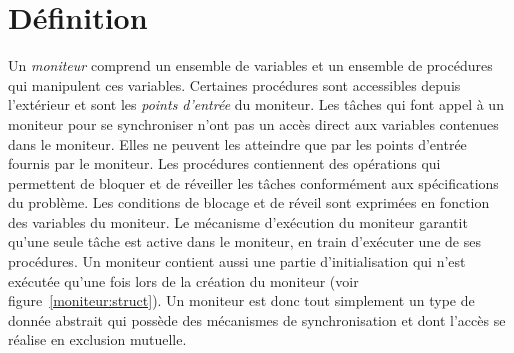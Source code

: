\section{Définition}
Un {\em moniteur} comprend un ensemble de variables et un ensemble de procédures qui manipulent ces variables. Certaines procédures sont accessibles depuis l'extérieur et sont les {\em points d'entrée} du moniteur. Les tâches qui font appel à un moniteur pour se synchroniser n'ont pas un accès direct aux variables contenues dans le moniteur. Elles ne peuvent les atteindre que par les points d'entrée fournis par le moniteur. Les procédures contiennent des opérations qui permettent de bloquer et de réveiller les tâches conformément aux spécifications du problème. Les conditions de blocage et de réveil sont exprimées en fonction des variables du moniteur. Le mécanisme d'exécution du moniteur garantit qu'une seule tâche est active dans le moniteur, en train d'exécuter une de ses procédures. Un moniteur contient aussi une partie d'initialisation qui n'est exécutée qu'une fois lors de la création du moniteur (voir figure~\ref{moniteur:struct}). Un moniteur est donc tout simplement un type de donnée abstrait qui possède des mécanismes de synchronisation et dont l'accès se réalise en exclusion mutuelle.
